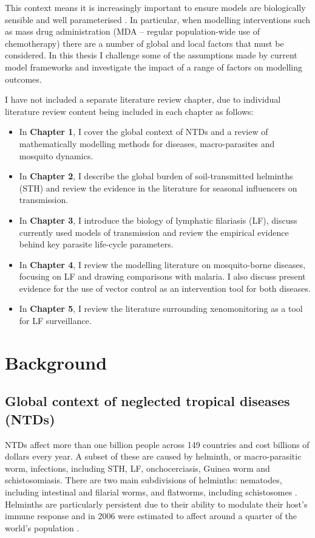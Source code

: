 This context means it is increasingly important to ensure models are biologically sensible and well parameterised \cite{Davis2019}. In particular, when modelling interventions such as mass drug administration (MDA -- regular population-wide use of chemotherapy) there are a number of global and local factors that must be considered. In this thesis I challenge some of the assumptions made by current model frameworks and investigate the impact of a range of factors on modelling outcomes.

I have not included a separate literature review chapter, due to individual literature review content being included in each chapter as follows:

\begin{itemize}
    \item In \textbf{Chapter 1}, I cover the global context of NTDs and a review of mathematically modelling methods for diseases, macro-parasites and mosquito dynamics.
    \item In \textbf{Chapter 2}, I describe the global burden of soil-transmitted helminths (STH) and review the evidence in the literature for seasonal influencers on transmission. 
    \item In \textbf{Chapter 3}, I introduce the biology of lymphatic filariasis (LF), discuss currently used models of transmission and review the empirical evidence behind key parasite life-cycle parameters. 
    \item In \textbf{Chapter 4}, I review the modelling literature on mosquito-borne diseases, focusing on LF and drawing comparisons with malaria. I also discuss present evidence for the use of vector control as an intervention tool for both diseases.
    \item In \textbf{Chapter 5}, I review the literature surrounding xenomonitoring as a tool for LF surveillance.
\end{itemize}

\section{Background}

\subsection{Global context of neglected tropical diseases (NTDs)}

NTDs affect more than one billion people across 149 countries \cite{WHO_NTD} and cost billions of dollars every year. A subset of these are caused by helminth, or macro-parasitic worm, infections, including STH, LF, onchocerciasis, Guinea worm and schistosomiasis. There are two main subdivisions of helminths: nematodes, including intestinal and filarial worms, and flatworms, including schistosomes \cite{Hotez2008}. Helminths are particularly persistent due to their ability to modulate their host's immune response \cite{Maizels2018} and in 2006 were estimated to affect around a quarter of the world's population \cite{Bethony2006}.

